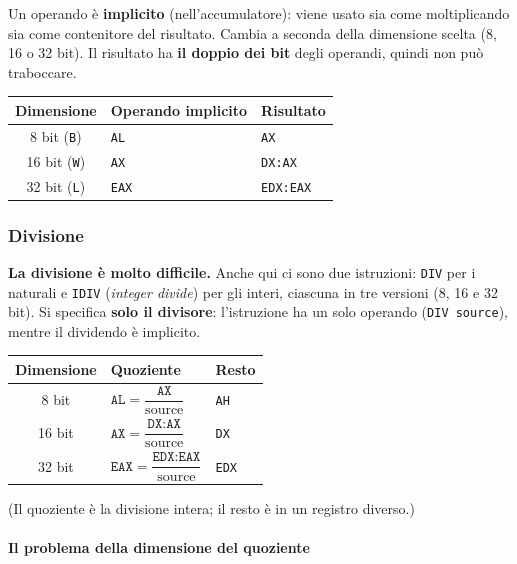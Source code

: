 \documentclass[11pt,a4paper]{article}
\begin{document}
Un operando è \textbf{implicito} (nell'accumulatore): viene usato sia come moltiplicando sia come contenitore del risultato. Cambia a seconda della dimensione scelta (8, 16 o 32 bit). Il risultato ha \textbf{il doppio dei bit} degli operandi, quindi non può traboccare.

\begin{center}
\begin{tabular}{c l l}
\textbf{Dimensione} & \textbf{Operando implicito} & \textbf{Risultato} \\ \hline
8 bit (\texttt{B}) & \texttt{AL} & \texttt{AX} \\
16 bit (\texttt{W}) & \texttt{AX} & \texttt{DX:AX} \\
32 bit (\texttt{L}) & \texttt{EAX} & \texttt{EDX:EAX} \\
\end{tabular}
\end{center}

\subsubsection*{Divisione}

\textbf{La divisione è molto difficile.} Anche qui ci sono due istruzioni: \texttt{DIV} per i naturali e \texttt{IDIV} (\emph{integer divide}) per gli interi, ciascuna in tre versioni (8, 16 e 32 bit). Si specifica \textbf{solo il divisore}: l'istruzione ha un solo operando (\texttt{DIV source}), mentre il dividendo è implicito.

\begin{center}
\begin{tabular}{c l l}
\textbf{Dimensione} & \textbf{Quoziente} & \textbf{Resto} \\ \hline
8 bit & $\texttt{AL} = \dfrac{\texttt{AX}}{\text{source}}$ & \texttt{AH} \\[2ex]
16 bit & $\texttt{AX} = \dfrac{\texttt{DX:AX}}{\text{source}}$ & \texttt{DX} \\[2ex]
32 bit & $\texttt{EAX} = \dfrac{\texttt{EDX:EAX}}{\text{source}}$ & \texttt{EDX} \\
\end{tabular}
\end{center}

(Il quoziente è la divisione intera; il resto è in un registro diverso.)

\paragraph*{Il problema della dimensione del quoziente}
\end{document}
